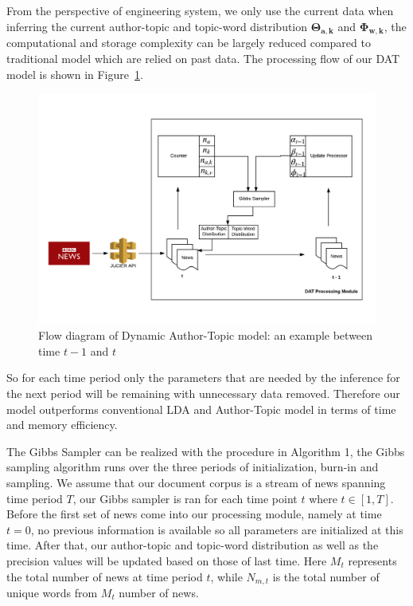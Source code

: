 From the perspective of engineering system, we only use the current data when inferring the current author-topic and topic-word distribution $\boldsymbol{\Theta_{a,k}}$ and $\boldsymbol{\Phi_{w,k}}$, the computational and storage complexity can be largely reduced compared to traditional model which are relied on past data. The processing flow of our DAT model is shown in Figure~\ref{fig:flow}. 


\begin{figure}[h]
\centering
\includegraphics[width=1.1\textwidth]{figures/model_description.png}
\caption{Flow diagram of Dynamic Author-Topic model: an example between time $t-1$ and $t$}
\label{fig:flow}
\end{figure}

So for each time period only the parameters that are needed by the inference for the next period will be remaining with unnecessary data removed. Therefore our model outperforms conventional LDA and Author-Topic model in terms of time and memory efficiency.

The Gibbs Sampler can be realized with the procedure in Algorithm 1, the Gibbs sampling algorithm runs over the three periods of initialization, burn-in and sampling. We assume that our document corpus is a stream of news spanning time period $T$, our Gibbs sampler is ran for each time point $t$ where $t \in [1,T]$. Before the first set of news come into our processing module, namely at time $t = 0$, no previous information is available so all parameters are initialized at this time. After that, our author-topic and topic-word distribution as well as the precision values will be updated based on those of last time. Here $M_t$ represents the total number of news at time period $t$, while $N_{m,t}$ is the total number of unique words from $M_t$ number of news.

